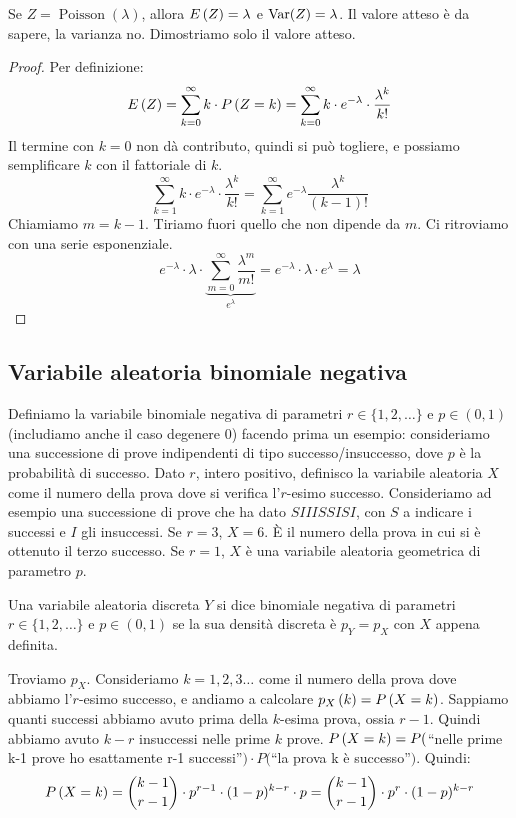 \begin{fact}
Se $Z = \operatorname{Poisson}(\lambda)$, allora $E \left( Z \right) = \lambda$ e $\operatorname{Var} (Z) = \lambda$. Il valore atteso \`e da sapere, la varianza no. Dimostriamo solo il valore atteso.
\end{fact}
\begin{proof}
Per definizione:
\[
E \left( Z \right) = \sum_{k = 0}^{\infty} k \cdot P \left( {Z = k} \right) = 
\sum_{k = 0}^{\infty} k \cdot e^{-\lambda} \cdot \frac{\lambda^k}{k!}
\]
Il termine con $k = 0$ non d\`a contributo, quindi si pu\`o togliere, e possiamo semplificare $k$ con il fattoriale di $k$.
\[
\sum_{k = 1}^{\infty} k \cdot e^{-\lambda} \cdot \frac{\lambda^k}{k!} =
\sum_{k = 1}^{\infty} e^{- \lambda} \frac{\lambda^k}{(k-1)!}
\]
Chiamiamo $m = k - 1$. Tiriamo fuori quello che non dipende da $m$. Ci ritroviamo con una serie esponenziale.
\[
e^{-\lambda} \cdot \lambda \cdot \underbrace{\sum_{m = 0}^{\infty} \frac{\lambda^m}{m!}}_{e^{\lambda}} = e^{-\lambda} \cdot \lambda \cdot e^{\lambda} = \lambda
\]
\end{proof}

\subsection{Variabile aleatoria binomiale negativa}

\begin{defn}
Definiamo la variabile binomiale negativa di parametri $r \in \{ 1, 2, \dots \}$ e $p \in (0,1)$ (includiamo anche il caso degenere 0) facendo prima un esempio: consideriamo una successione di prove indipendenti di tipo successo/insuccesso, dove $p$ \`e la probabilit\`a di successo. Dato $r$, intero positivo, definisco la variabile aleatoria $X$ come il numero della prova dove si verifica l'$r$-esimo successo. Consideriamo ad esempio una successione di prove che ha dato $SIIISSISI$, con $S$ a indicare i successi e $I$ gli insuccessi. Se $r = 3$, $X = 6$. \`E il numero della prova in cui si \`e ottenuto il terzo successo. Se $r = 1$, $X$ \`e una variabile aleatoria geometrica di parametro $p$.

Una variabile aleatoria discreta $Y$ si dice binomiale negativa di parametri $r \in \{ 1, 2, \dots \}$ e $p \in (0,1)$ se la sua densit\`a discreta \`e $p_Y = p_X$ con $X$ appena definita.

Troviamo $p_X$. Consideriamo $k = 1, 2, 3 \dots$ come il numero della prova dove abbiamo l'$r$-esimo successo, e andiamo a calcolare $p_{X} \left( k \right) = P \left( {X = k} \right)$. Sappiamo quanti successi abbiamo avuto prima della $k$-esima prova, ossia $r-1$. Quindi abbiamo avuto $k-r$ insuccessi nelle prime $k$ prove. $P \left( {X = k} \right) = P($``nelle prime k-1 prove ho esattamente r-1 successi''$) \cdot P($``la prova k \`e successo''$)$. Quindi:
\[
P \left( {X = k} \right) = \binom{k-1}{r-1} \cdot p^{r-1} \cdot (1 - p)^{k - r} \cdot p = 
\binom{k-1}{r-1} \cdot p^r \cdot (1-p)^{k - r}
\]
\end{defn}

